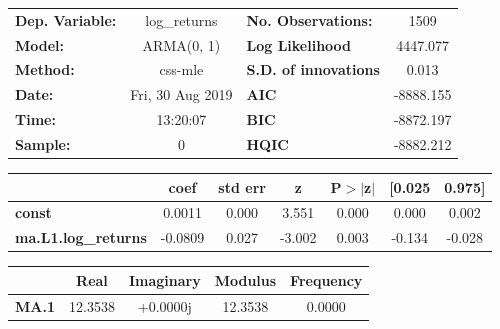\begin{center}
\begin{tabular}{lclc}
\toprule
\textbf{Dep. Variable:}     &        log\_returns       & \textbf{  No. Observations:  } &            1509            \\
\textbf{Model:}             &         ARMA(0, 1)        & \textbf{  Log Likelihood     } &          4447.077          \\
\textbf{Method:}            &          css-mle          & \textbf{  S.D. of innovations} &           0.013            \\
\textbf{Date:}              &      Fri, 30 Aug 2019     & \textbf{  AIC                } &         -8888.155          \\
\textbf{Time:}              &          13:20:07         & \textbf{  BIC                } &         -8872.197          \\
\textbf{Sample:}            &             0             & \textbf{  HQIC               } &         -8882.212          \\
\bottomrule
\end{tabular}
\begin{tabular}{lcccccc}
                            & \textbf{coef} & \textbf{std err} & \textbf{z} & \textbf{P$> |$z$|$} & \textbf{[0.025} & \textbf{0.975]}  \\
\midrule
\textbf{const}              &       0.0011  &        0.000     &     3.551  &         0.000        &        0.000    &        0.002     \\
\textbf{ma.L1.log\_returns} &      -0.0809  &        0.027     &    -3.002  &         0.003        &       -0.134    &       -0.028     \\
\bottomrule
\end{tabular}
\begin{tabular}{lcccc}
              & \textbf{            Real} & \textbf{         Imaginary} & \textbf{         Modulus} & \textbf{        Frequency}  \\
\midrule
\textbf{MA.1} &               12.3538     &                +0.0000j     &               12.3538     &                0.0000       \\
\bottomrule
\end{tabular}
\end{center}
